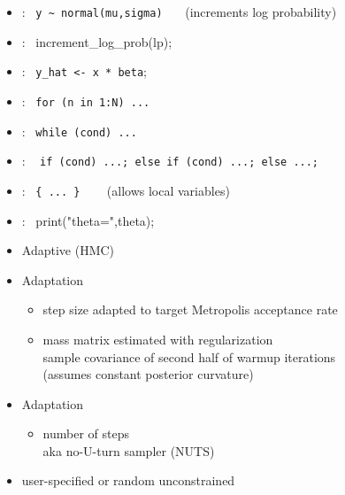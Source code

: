 \documentclass[10pt]{report}
\newcommand{\sld}[1]{\newpage{\noindent\LARGE \ \ \
    \textcolor{MidnightBlue}{\bfseries #1}}\vspace*{4pt}}
\newcommand{\code}[1]{{\tt #1}}
\newcommand{\myemph}[1]{{\color{MidnightBlue}{\bfseries #1}}}
\begin{document}
\begin{itemize}
\item \myemph{Sampling}: \ {\footnotesize \Verb|y ~ normal(mu,sigma)|}
\ \ \ {\footnotesize (increments log probability)}
%
\item \myemph{Log probability}: \ {\footnotesize increment\_log\_prob(lp);}
\item \myemph{Assignment}: \  {\footnotesize \code{y\_hat <- x * beta};}
%
\item \myemph{For loop}: \ {\footnotesize \code{for (n in 1:N) ...}}
%
\item \myemph{While loop}: \ {\footnotesize \code{while (cond) ...}}
%
\item \myemph{Conditional}: \ {\footnotesize
\code{if (cond) ...; else if (cond) ...;  else ...;}}
\item \myemph{Block}: \ {\footnotesize \Verb|{ ... }|}  \ \ \ {\footnotesize
   (allows local variables)}
\item \myemph{Print}: \ {\footnotesize print("theta=",theta);}
\end{itemize}

\sld{Full Bayes with MCMC}

\begin{itemize}
\item Adaptive \myemph{Hamiltonian Monte Carlo} (HMC)
%
\item Adaptation \myemph{during warmup}
\vspace*{-4pt}
\begin{itemize}\small
\item step size adapted to target Metropolis acceptance rate
\item mass matrix estimated with regularization
{\footnotesize
\\ sample covariance of second half of warmup iterations
\\ (assumes constant posterior curvature)
}
\end{itemize}
%
\item Adaptation \myemph{during sampling}
\vspace*{-4pt}
\begin{itemize}\small
\item number of steps
\\
{\footnotesize aka no-U-turn sampler (NUTS)}
\end{itemize}
%
\item \myemph{Initialization} user-specified or random unconstrained
\end{itemize}
\end{document}
